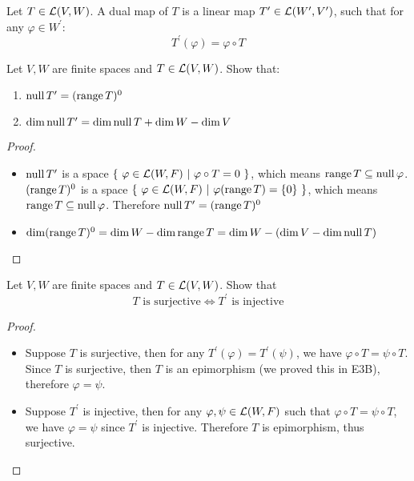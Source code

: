 \documentclass[../main.tex]{subfiles}
\begin{document}
\setcounter{definition}{117}
\begin{definition}
  Let $T \in \mathcal{L}(V, W)$. A dual map of $T$ is a linear map $T^\prime \in \mathcal{L}(W^\prime, V^\prime)$, such that
  for any $\varphi \in W^\prime$:
  \[
  T^\prime(\varphi) = \varphi \circ T
  \]
\end{definition}

\setcounter{theorem}{127}
\begin{theorem}
  Let $V, W$ are finite spaces and $T \in \mathcal{L}(V, W)$. Show that:
  \begin{enumerate}
    \item $\operatorname{null} T^\prime = (\operatorname{range} T)^0$
    \item $\dim \operatorname{null} T^\prime = \dim \operatorname{null} T + \dim W - \dim V$
  \end{enumerate}
\end{theorem}
\begin{proof}
  ~
  \begin{itemize}
    \item $\operatorname{null} T^\prime$ is a space $\{ \ \varphi \in \mathcal{L}(W, F) \ | \ \varphi \circ T = 0 \ \}$,
          which means $\operatorname{range} T \subseteq \operatorname{null} \varphi$.
          $(\operatorname{range} T)^0$ is a space $\{ \ \varphi \in \mathcal{L}(W, F) \ | \ \varphi(\operatorname{range} T) = \{0\} \ \}$,
          which means $\operatorname{range} T \subseteq \operatorname{null} \varphi$.
          Therefore $\operatorname{null} T^\prime = (\operatorname{range} T)^0$
    \item $\dim (\operatorname{range} T)^0 = \dim W - \dim \operatorname{range} T = \dim W - (\dim V - \dim \operatorname{null} T)$
  \end{itemize}
\end{proof}

\begin{theorem}
  Let $V, W$ are finite spaces and $T \in \mathcal{L}(V, W)$. Show that
  \[
  T \text{ is surjective} \iff T^\prime \text{ is injective}
  \]
\end{theorem}
\begin{proof}
  ~
  \begin{itemize}
    \item Suppose $T$ is surjective, then for any $T^\prime(\varphi) = T^\prime(\psi)$,
          we have $\varphi \circ T = \psi \circ T$. Since $T$ is surjective, then $T$
          is an epimorphism (we proved this in \textnormal{E3B}),
          therefore $\varphi = \psi$.

    \item Suppose $T^\prime$ is injective, then for any $\varphi, \psi \in \mathcal{L}(W, F)$
          such that $\varphi \circ T = \psi \circ T$, we have $\varphi = \psi$
          since $T^\prime$ is injective. Therefore $T$ is epimorphism, thus surjective.
  \end{itemize}
\end{proof}
\end{document}

